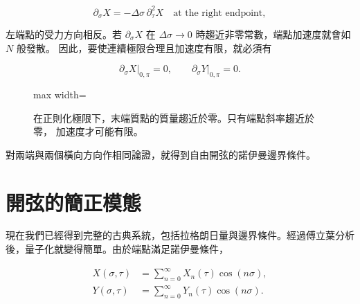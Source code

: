 \begin{equation}
  \partial_\sigma X
  =
  -\Delta\sigma\,\partial_\tau^2X
  \quad\text{at the right endpoint},
  \label{eq:l02-endpoint-scaling}
\end{equation}

左端點的受力方向相反。若 \(\partial_\sigma X\) 在
\(\Delta\sigma\to0\) 時趨近非零常數，端點加速度就會如 \(N\) 般發散。
因此，要使連續極限合理且加速度有限，就必須有

\begin{equation}
  \left.\partial_\sigma X\right|_{0,\pi}=0,
  \qquad
  \left.\partial_\sigma Y\right|_{0,\pi}=0.
  \label{eq:l02-open-neumann}
\end{equation}

\begin{figure}[H]
  \centering
  \begin{adjustbox}{max width=\linewidth}
  \end{adjustbox}
  \caption{在正則化極限下，末端質點的質量趨近於零。只有端點斜率趨近於零，
  加速度才可能有限。}
  \label{fig:l02-neumann-redraw}
\end{figure}

對兩端與兩個橫向方向作相同論證，就得到自由開弦的諾伊曼邊界條件。

\section{開弦的簡正模態}

現在我們已經得到完整的古典系統，包括拉格朗日量與邊界條件。經過傅立葉分析後，量子化就變得簡單。由於端點滿足諾伊曼條件，

\begin{align}
  X(\sigma,\tau)
  &=
  \sum_{n=0}^{\infty}X_n(\tau)\cos(n\sigma),
  \label{eq:l02-X-expansion}\\
  Y(\sigma,\tau)
  &=
  \sum_{n=0}^{\infty}Y_n(\tau)\cos(n\sigma).
  \label{eq:l02-Y-expansion}
\end{align}

